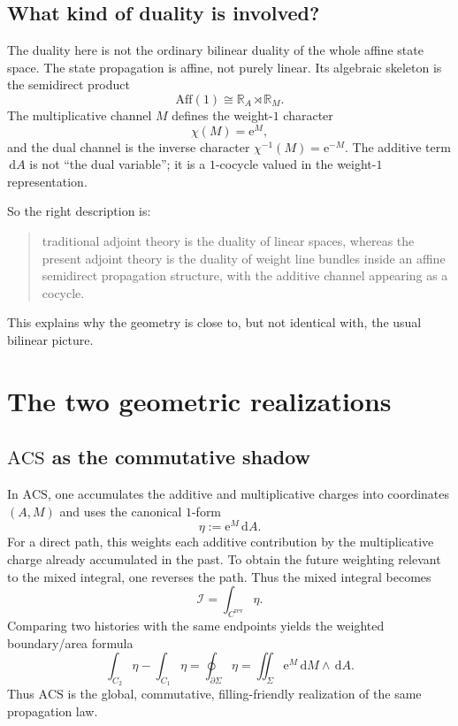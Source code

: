 \documentclass[11pt]{article}
\newcommand{\dd}{\,\mathrm{d}}
\newcommand{\ee}{\mathrm{e}}
\newcommand{\ACS}{\mathrm{ACS}}
\newcommand{\Aff}{\mathrm{Aff}}
\newcommand{\rev}{\mathrm{rev}}
\newcommand{\Ipath}{\mathcal{I}}
\begin{document}
\subsection{What kind of duality is involved?}

The duality here is not the ordinary bilinear duality of the whole affine state space. The state propagation is affine, not purely linear. Its algebraic skeleton is the semidirect product
\begin{equation}
\label{eq:aff1}
\Aff(1)\cong \mathbb R_A\rtimes \mathbb R_M.
\end{equation}
The multiplicative channel $M$ defines the weight-$1$ character
\[
\chi(M)=\ee^M,
\]
and the dual channel is the inverse character $\chi^{-1}(M)=\ee^{-M}$. The additive term $\dd A$ is not ``the dual variable''; it is a $1$-cocycle valued in the weight-$1$ representation.

So the right description is:
\begin{quote}
traditional adjoint theory is the duality of linear spaces, whereas the present adjoint theory is the duality of weight line bundles inside an affine semidirect propagation structure, with the additive channel appearing as a cocycle.
\end{quote}
This explains why the geometry is close to, but not identical with, the usual bilinear picture.

\section{The two geometric realizations}

\subsection{$\ACS$ as the commutative shadow}

In $\ACS$, one accumulates the additive and multiplicative charges into coordinates $(A,M)$ and uses the canonical $1$-form
\begin{equation}
\label{eq:eta-acs}
\eta:=\ee^M\dd A.
\end{equation}
For a direct path, this weights each additive contribution by the multiplicative charge already accumulated in the past. To obtain the future weighting relevant to the mixed integral, one reverses the path. Thus the mixed integral becomes
\begin{equation}
\label{eq:mixed-acs}
\Ipath=\int_{C^{\rev}}\eta.
\end{equation}
Comparing two histories with the same endpoints yields the weighted boundary/area formula
\begin{equation}
\label{eq:acs-stokes}
\int_{C_2}\eta-\int_{C_1}\eta
=
\oint_{\partial\Sigma}\eta
=
\iint_\Sigma \ee^M\dd M\wedge \dd A.
\end{equation}
Thus $\ACS$ is the global, commutative, filling-friendly realization of the same propagation law.
\end{document}
